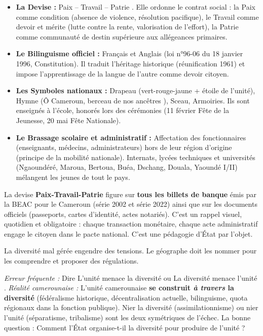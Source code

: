 \documentclass[11pt]{article}
\newcommand{\cle}[1]{{\popxbold\color{popdark}#1}}
\newcounter{popsec}
\newcounter{popsub}
\newcommand{\courssub}[1]{%
  \stepcounter{popsub}%
  \par\vspace{9pt}\noindent{\popxbold\fontsize{11.5}{13}\selectfont\color{popink}{\color{poporange}\thepopsec.\thepopsub}\hspace{6pt}#1}\par\nopagebreak\vspace{4pt}
}
\begin{document}
\begin{propriete}
\begin{itemize}
    \item \textbf{La Devise :} \og Paix -- Travail -- Patrie \fg. Elle ordonne le contrat social : la \cle{Paix} comme condition (absence de violence, résolution pacifique), le \cle{Travail} comme devoir et mérite (lutte contre la rente, valorisation de l'effort), la \cle{Patrie} comme communauté de destin supérieure aux allégeances primaires.
    \item \textbf{Le Bilinguisme officiel :} Français et Anglais (loi n°96-06 du 18 janvier 1996, Constitution). Il traduit l'héritage historique (réunification 1961) et impose l'apprentissage de la langue de l'autre comme devoir citoyen.
    \item \textbf{Les Symboles nationaux :} Drapeau (vert-rouge-jaune + étoile de l'unité), Hymne (\og Ô Cameroun, berceau de nos ancêtres \fg), Sceau, Armoiries. Ils sont enseignés à l'école, honorés lors des cérémonies (11 février Fête de la Jeunesse, 20 mai Fête Nationale).
    \item \textbf{Le Brassage scolaire et administratif :} Affectation des fonctionnaires (enseignants, médecins, administrateurs) hors de leur région d'origine (principe de la \cle{mobilité nationale}). Internats, lycées techniques et universités (Ngaoundéré, Maroua, Bertoua, Buéa, Dschang, Douala, Yaoundé I/II) mélangent les jeunes de tout le pays.
\end{itemize}
\end{propriete}

\begin{savaistu}
La devise \og \textbf{Paix-Travail-Patrie} \fg figure sur \textbf{tous les billets de banque} émis par la BEAC pour le Cameroun (série 2002 et série 2022) ainsi que sur les documents officiels (passeports, cartes d'identité, actes notariés). C'est un rappel visuel, quotidien et obligatoire : chaque transaction monétaire, chaque acte administratif engage le citoyen dans le pacte national. C'est une pédagogie d'État par l'objet.
\end{savaistu}

\courssub{Les défis : quand la diversité devient fracture}

La diversité mal gérée engendre des tensions. Le géographe doit les nommer pour les comprendre et proposer des régulations.

\begin{attention}
\emph{Erreur fréquente :} Dire \og L'unité menace la diversité \fg ou \og La diversité menace l'unité \fg.
\emph{Réalité camerounaise :} L'unité camerounaise \textbf{se construit \emph{à travers} la diversité} (fédéralisme historique, décentralisation actuelle, bilinguisme, quota régionaux dans la fonction publique). Nier la diversité (assimilationnisme) ou nier l'unité (séparatisme, tribalisme) sont les deux symétriques de l'échec. La bonne question : \og Comment l'État organise-t-il la diversité pour produire de l'unité ? \fg
\end{attention}
\end{document}
